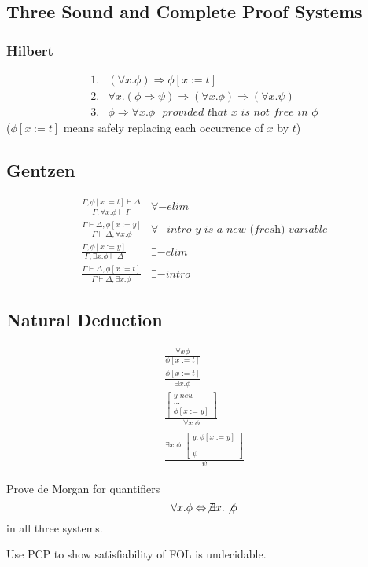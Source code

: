 \subsection{Three Sound and Complete Proof Systems}
\subsubsection{Hilbert}
\[
\begin{split}
1. &(\forall x. \phi) \Rightarrow \phi[x:=t]  \\
2. &\forall x. (\phi \Rightarrow \psi) \Rightarrow (\forall x. \phi) \Rightarrow (\forall x. \psi) \\ 
3. & \phi \Rightarrow \forall x. \phi ~~~ \textit{provided that } x \textit{ is not free in } \phi
\end{split}
\]
($\phi[x:=t]$ means safely replacing each occurrence of $x$ by $t$) \\

\subsection{Gentzen}
\[
\begin{split}
\frac{\Gamma, \phi[x:=t] \vdash \Delta}{\Gamma, \forall x. \phi \vdash \Gamma} &  \forall-elim \\
\frac{\Gamma \vdash \Delta, \phi[x:=y]}{\Gamma \vdash \Delta, \forall x. \phi} &  \forall-intro \textit{ y is a new (fresh) variable} \\
\frac{\Gamma, \phi[x:=y]}{\Gamma, \exists x. \phi \vdash \Delta} & \exists-elim \\ 
\frac{\Gamma \vdash \Delta, \phi[x:=t]}{\Gamma \vdash \Delta, \exists x. \phi} & \exists-intro
\end{split}
\]

\subsection{Natural Deduction}
\[
\begin{split}
    \frac{\forall x \phi}{\phi[x:=t]} \\ 
    \frac{\phi[x:=t]}{\exists x. \phi} \\ 
    \frac{\begin{bmatrix}
        y \textit{ new} \\ 
        ...\\
        \phi[x:=y]
    \end{bmatrix}}{\forall x. \phi} \\ 
    \frac{ \exists x. \phi, \begin{bmatrix}
        y: \phi[x:=y] \\ 
        ...\\
        \psi 
    \end{bmatrix}}{\psi}
\end{split}
\]

\begin{homework} Prove de Morgan for quantifiers 
\[
\forall x. \phi \Leftrightarrow \not \exists x. \not \phi
\]
in all three systems. 
\end{homework}

\begin{homework}
	 Use PCP to show satisfiability of FOL is undecidable. 
\end{homework}
